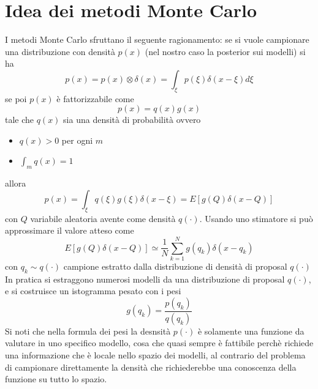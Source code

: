 \documentclass[10pt,a4paper,oneside,openany,noindent]{book}
\begin{document}
\section{Idea dei metodi Monte Carlo}
I metodi Monte Carlo sfruttano il seguente ragionamento: se si vuole  campionare una distribuzione con densità $p(x)$ (nel nostro caso la posterior sui modelli) si ha
\begin{equation}
p(x)=p(x)\otimes \delta(x)=\int_\xi p(\xi)\delta(x-\xi)d\xi
\end{equation}
se poi $p(x)$ è fattorizzabile come \begin{equation}
p(x)=q(x)g(x)
\end{equation}
tale che $q(x)$ sia una densità di probabilità ovvero
\begin{itemize}
\item $q(x)>0$ per ogni $m$
\item $\int_m q(x)=1$
\end{itemize} allora
\begin{equation}
p(x)=\int_\xi q(\xi)g(\xi)\delta(x-\xi)= E[g(Q)\delta(x-Q)]
\end{equation}
con $Q$ variabile aleatoria avente come densità $q(\cdot)$.
Usando uno stimatore si può approssimare il valore atteso come
\begin{equation}
E[g(Q)\delta(x-Q)]\simeq \frac{1}{N}\sum_{k=1}^N g(q_k)\delta(x-q_k)
\end{equation}
con $q_k\sim q(\cdot)$ campione estratto dalla distribuzione di densità di proposal $q(\cdot)$
In pratica si estraggono numerosi modelli da una distribuzione di proposal $q(\cdot)$,
e si costruisce un istogramma pesato con i pesi 
\begin{equation}
g(q_k)=\frac{p(q_k)}{q(q_k)}
\end{equation}
Si noti che nella formula dei pesi la desnsità  $p(\cdot)$ è solamente una funzione da valutare in uno specifico modello, cosa che quasi sempre è fattibile  perchè richiede una informazione che è locale nello spazio dei modelli, al contrario del problema di campionare direttamente la densità che richiederebbe una conoscenza della funzione su tutto lo spazio.\\
\end{document}
